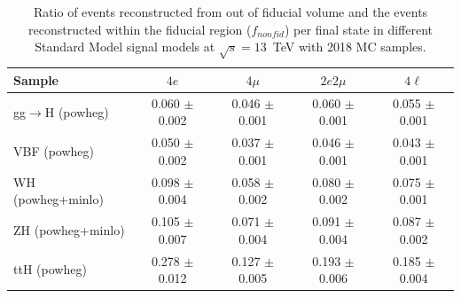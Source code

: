 \begin{table}[!h!tb]
\begin{center}
\small
\caption{
Ratio of events reconstructed from out of fiducial volume and the events reconstructed within the fiducial region ($f_{nonfid}$) per
 final state in different Standard Model signal models at $\sqrt{s} =  13$~TeV with 2018 MC samples.
\label{tab:foutSM}
}
\begin{tabular}{|l|c|c|c|c|} \hline
Sample & $4e$ & $4\mu$ & $2e2\mu$ & $4\ell$ \\ \hline
gg$\rightarrow$H ({\sc powheg})  & 0.060 $\pm$ 0.002 & 0.046 $\pm$ 0.001 & 0.060 $\pm$ 0.001 & 0.055 $\pm$ 0.001 \\
VBF ({\sc powheg})  & 0.050 $\pm$ 0.002 & 0.037 $\pm$ 0.001 & 0.046 $\pm$ 0.001 & 0.043 $\pm$ 0.001 \\
WH ({\sc powheg+minlo}) & 0.098 $\pm$ 0.004 & 0.058 $\pm$ 0.002 & 0.080 $\pm$ 0.002 & 0.075 $\pm$ 0.001 \\
ZH ({\sc powheg+minlo})  & 0.105 $\pm$ 0.007 & 0.071 $\pm$ 0.004 & 0.091 $\pm$ 0.004 & 0.087 $\pm$ 0.002 \\
ttH ({\sc powheg}) & 0.278 $\pm$ 0.012 & 0.127 $\pm$ 0.005 & 0.193 $\pm$ 0.006 & 0.185 $\pm$ 0.004 \\
\hline
\end{tabular}
\normalsize
\end{center}
\end{table}


